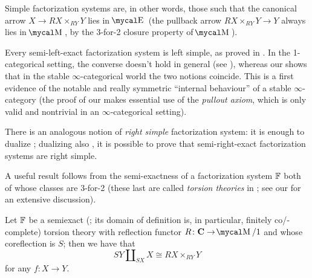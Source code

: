 Simple factorization systems are, in other words, those such that the canonical arrow $X\to RX\times_{RY}Y$ lies in $\EE$ (the pullback arrow $RX\times_{RY}Y\to Y$ always lies in $\MM$, by the 3\hyp{}for\hyp{}2 closure property of $\MM$).
\begin{remark}
Every semi\hyp{}left\hyp{}exact factorization system is left simple, as proved in \cite[Thm. \textbf{4.3}]{CHK}. In the 1\hyp{}categorical setting, the converse doesn't hold in general (see \cite[Example \textbf{4.4}]{CHK}), whereas our \aprop {} shows that in the stable $\infty$\hyp{}categorical world the two notions coincide. This is a first evidence of the notable and really symmetric ``internal behaviour'' of a stable $\infty$\hyp{}category (the proof of our  makes essential use of the \emph{pullout axiom}, which is only valid and nontrivial in an $\infty$\hyp{}categorical setting).
\end{remark}
\begin{remark}
There is an analogous notion of \emph{right simple} factorization system: it is enough to dualize \adef {}; dualizing also \cite[Thm. \textbf{4.3}]{CHK}, it is possible to prove that semi\hyp{}right\hyp{}exact factorization systems are right simple.
\end{remark}
A useful result follows from the semi\hyp{}exactness of a factorization system $\mathbb{F}$ both of whose classes are 3\hyp{}for\hyp{}2 (these last are called \emph{torsion theories} in \cite{RT}; see our \adef {} for an extensive discussion).
\begin{proposition}
\label{facto}Let $\mathbb{F}$ be a semiexact (\adef {}; its domain of definition is, in particular, finitely co\fshyp{}complete) torsion theory with reflection functor $R\colon \CC\to \MM/1$ and whose coreflection is $S$; then we have that
\[
SY \amalg_{SX}X \cong RX \times_{RY}Y 
\]
for any $f\colon X\to Y$.
\end{proposition}

